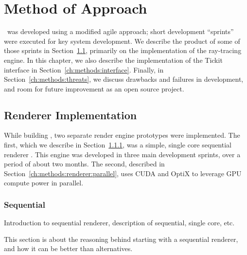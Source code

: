 %
%
%
\chapter{Method of Approach} \label{ch:methods}

\name\ was developed using a modified agile approach; short development ``sprints'' were executed for key system development.
We describe the product of some of those sprints in Section~\ref{ch:methods:renderer}, primarily on the implementation of the ray-tracing engine.
In this chapter, we also describe the implementation of the Tickit interface in Section~\ref{ch:methods:interface}.
Finally, in Section~\ref{ch:methods:threats}, we discuss drawbacks and failures in development, and room for future improvement as an open source project.


\section{Renderer Implementation} \label{ch:methods:renderer}
While building \name, two separate render engine prototypes were implemented.
The first, which we describe in Section~\ref{ch:methods:renderer:sequential}, was a simple, single core sequential renderer \cite{raytermCpuImpl}.
This engine was developed in three main development sprints, over a period of about two months.
The second, described in Section~\ref{ch:methods:renderer:parallel}, uses CUDA \cite{nvidia2011cuda} and OptiX \cite{parker2010optix} to leverage GPU compute power in parallel.


\subsection{Sequential} \label{ch:methods:renderer:sequential}

Introduction to sequential renderer, description of sequential, single core, etc.

 \label{ch:methods:renderer:sequential:motivation}

This section is about the reasoning behind starting with a sequential renderer, and how it can be better than alternatives.

 \label{ch:methods:renderer:sequential:libraries}

